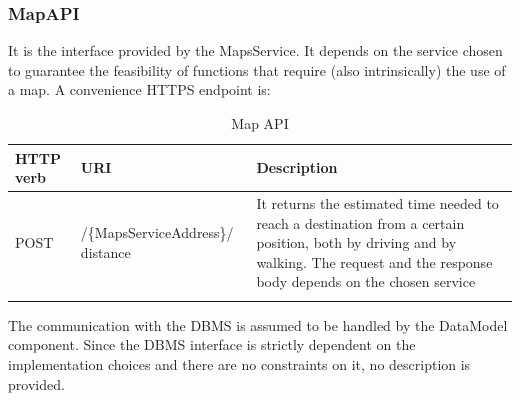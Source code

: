 \documentclass[a4paper,oneside,11pt]{book}
\begin{document}
    \subsubsection{MapAPI}
    It is the interface provided by the MapsService. It depends on the service chosen to guarantee the feasibility of functions that require (also intrinsically) the use of a map. A convenience HTTPS endpoint is:
    \begin{longtable}[c] { |>{\centering\arraybackslash}H{0.11\textwidth}|>{\centering\arraybackslash\ttfamily}P{0.41\textwidth}|H{0.32\textwidth}| }
        \hline
        \textbf{HTTP verb} & \textrm{\textbf{URI}} & \textbf{\textbf{Description}} \\ \hline
        POST & /\{MapsServiceAddress\}/ distance & It returns the estimated time needed to reach a destination from a certain position, both by driving and by walking. The request and the response body depends on the chosen service \\ \hline
        \caption{Map API}
        \label{table:map_api}
    \end{longtable}
    
    The communication with the DBMS is assumed to be handled by the DataModel component. Since the DBMS interface is strictly dependent on the implementation choices and there are no constraints on it, no description is provided.
    
\end{document}

